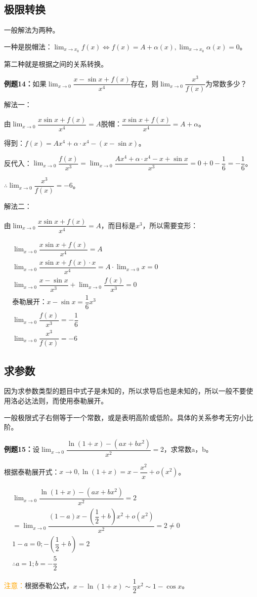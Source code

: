 \documentclass[UTF8, 12pt]{ctexart}
\begin{document}
\subsection{极限转换}

一般解法为两种。

一种是脱帽法：$\lim_{x\to x_0}f(x)\Leftrightarrow f(x)=A+\alpha(x),\lim_{x\to x_0}\alpha(x)=0$。

第二种就是根据之间的关系转换。

\textbf{例题14：}如果$\lim_{x\to 0}\dfrac{x-\sin x+f(x)}{x^4}$存在，则$\lim_{x\to 0}\dfrac{x^3}{f(x)}$为常数多少？

解法一：

由$\lim_{x\to 0}\dfrac{x\sin x+f(x)}{x^4}=A$脱帽：$\dfrac{x\sin x+f(x)}{x^4}=A+\alpha$。

得到：$f(x)=Ax^4+\alpha\cdot x^4-(x-\sin x)$。

反代入：$\lim_{x\to 0}\dfrac{f(x)}{x^3}=\lim_{x\to 0}\dfrac{Ax^4+\alpha\cdot x^4-x+\sin x}{x^3}=0+0-\dfrac{1}{6}=-\dfrac{1}{6}$。

$\therefore \lim_{x\to 0}\dfrac{x^3}{f(x)}=-6$。

解法二：

由$\lim_{x\to 0}\dfrac{x\sin x+f(x)}{x^4}=A$，而目标是$x^3$，所以需要变形：

$
\begin{aligned}
    & \lim_{x\to 0}\dfrac{x\sin x+f(x)}{x^4}=A \\
    & \lim_{x\to 0}\dfrac{x\sin x+f(x)\cdot x}{x^4}=A\cdot\lim_{x\to 0}x=0 \\
    & \lim_{x\to 0}\dfrac{x-\sin x}{x^3}+\lim_{x\to 0}\dfrac{f(x)}{x^3}=0 \\
    & \text{泰勒展开：}x-\sin x=\dfrac{1}{6}x^3 \\
    & \lim_{x\to 0}\dfrac{f(x)}{x^3}=-\dfrac{1}{6} \\
    & \lim_{x\to 0}\dfrac{x^3}{f(x)}=-6
\end{aligned}
$

\subsection{求参数}

因为求参数类型的题目中式子是未知的，所以求导后也是未知的，所以一般不要使用洛必达法则，而使用泰勒展开。

一般极限式子右侧等于一个常数，或是表明高阶或低阶。具体的关系参考无穷小比阶。

\textbf{例题15：}设$\lim_{x\to 0}\dfrac{\ln(1+x)-(ax+bx^2)}{x^2}=2$，求常数a，b。

根据泰勒展开式：$x\to 0,\ln(1+x)=x-\dfrac{x^2}{x}+o(x^2)$。

$
\begin{aligned}
    & \lim_{x\to 0}\dfrac{\ln(1+x)-(ax+bx^2)}{x^2}=2 \\
    & =\lim_{x\to 0}\dfrac{(1-a)x-\left(\dfrac{1}{2}+b\right)x^2+o(x^2)}{x^2}=2\neq 0 \\
    & 1-a=0;-\left(\dfrac{1}{2}+b\right)=2 \\
    & \therefore a=1;b=-\dfrac{5}{2}
\end{aligned}
$

\textcolor{orange}{注意：}根据泰勒公式，$x-\ln(1+x)\sim\dfrac{1}{2}x^2\sim 1-\cos x$。
\end{document}
